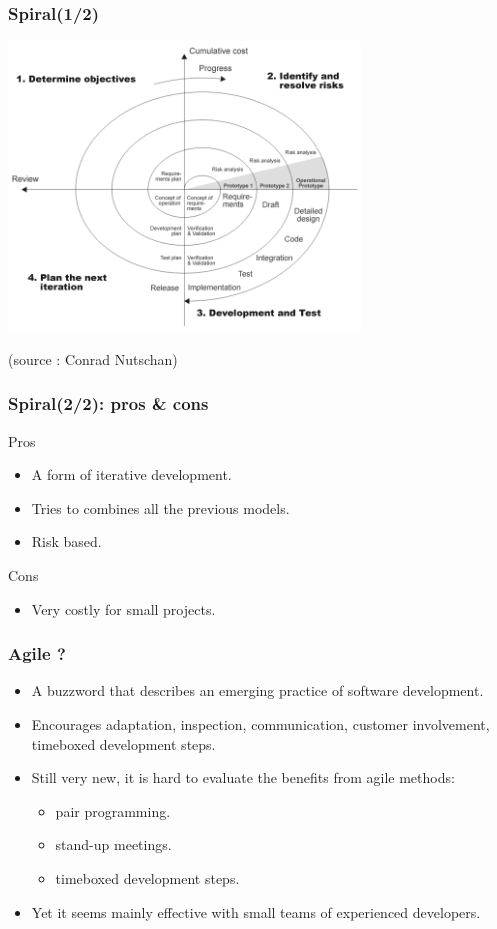 \documentclass[10pt]{beamer}
\begin{document}
\begin{frame}[fragile]
  \frametitle{Spiral(1/2)}
  \begin{center}
    \includegraphics[width=0.7\textwidth]{spiral_model}
  \end{center}

  \tiny (source : Conrad Nutschan)
\end{frame}
\begin{frame}[fragile]
  \frametitle{Spiral(2/2): pros \& cons}
  \begin{exampleblock}{Pros}
    \begin{itemize}
    \item A form of iterative development.
    \item Tries to combines all the previous models.
    \item Risk based.
    \end{itemize}
  \end{exampleblock}
  \begin{alertblock}{Cons}
    \begin{itemize}
    \item Very costly for small projects.
    \end{itemize}
  \end{alertblock}
\end{frame}


\begin{frame}[fragile]
  \frametitle{Agile ?}
  \begin{itemize}
  \item A buzzword that describes an emerging practice of software development.
  \item Encourages adaptation, inspection, communication, customer involvement,
    timeboxed development steps.
  \item Still very new, it is hard to evaluate the benefits from agile methods:
    \begin{itemize}
    \item pair programming.
    \item stand-up meetings.
    \item timeboxed development steps.
    \end{itemize}
  \item Yet it seems mainly effective with small teams of experienced developers.
  \end{itemize}
\end{frame}
\end{document}
